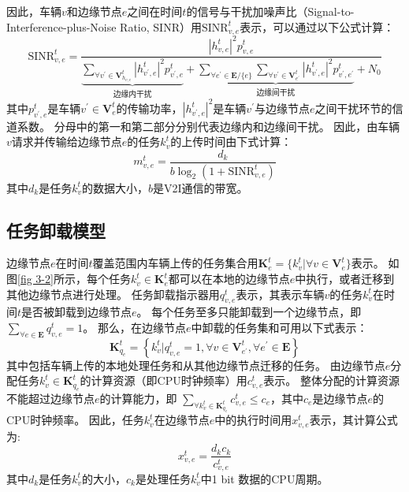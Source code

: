 因此，车辆$v$和边缘节点$e$之间在时间$t$的信号与干扰加噪声比（Signal-to-Interference-plus-Noise Ratio, SINR）用$\mathrm{SINR}_{v, e}^t$表示，可以通过以下公式计算：
\begin{equation}
	\mathrm{SINR}_{v, e}^t = \frac{ |h_{v, e}^t| ^{2}  p_{v, e}^{t}}{ \underbrace{\sum\limits_{\forall v^{\prime} \in \mathbf{V}_{h_{v, e}}^{t}} |h_{v^{\prime}, e}^t|^2 p_{v^{\prime}, e}^{t}}_{\text {边缘内干扰}} + \underbrace{\sum\limits_{\forall e^{\prime} \in \mathbf{E} / \{e\}} \sum\limits_{\forall v^{\prime} \in \mathbf{V}_{e^{\prime}}^{t}} |h_{v^{\prime}, e}^t|^2 p_{v^{\prime}, e^{\prime}}^{t}}_{\text {边缘间干扰}} + N_{0}}
\end{equation}
其中$p_{v^{\prime}, e}^{t}$是车辆$v^{\prime} \in \mathbf{V}_{e}^{t}$的传输功率，$|h_{v^{\prime}, e}^t|^2$是车辆$v^{\prime}$与边缘节点$e$之间干扰环节的信道系数。
分母中的第一和第二部分分别代表边缘内和边缘间干扰。
因此，由车辆$v$请求并传输给边缘节点$e$的任务$k_{v}^{t}$的上传时间由下式计算：
\begin{equation}
	m_{v, e}^{t} = \frac{d_{k}}{b  \log _{2}\left(1+\mathrm{SINR}_{v, e}^t\right)}
\end{equation}
其中$d_k$是任务$k_{v}^{t}$的数据大小，$b$是V2I通信的带宽。

\subsection[\hspace{-2pt}任务卸载模型]{{ \hspace{-8pt}任务卸载模型}}

边缘节点$e$在时间$t$覆盖范围内车辆上传的任务集合用$\mathbf{K}_{e}^{t} = \{ k_{v}^{t}| \forall v \in \mathbf{V}_{e}^{t} \}$表示。 
如图\ref{fig 3-2}所示，每个任务$k_{v}^{t} \in \mathbf{K}_{e}^{t}$都可以在本地的边缘节点$e$中执行，或者迁移到其他边缘节点进行处理。
任务卸载指示器用$q_{v, e}^{t}$表示，其表示车辆$v$的任务$k_{v}^{t}$在时间$t$是否被卸载到边缘节点$e$。
每个任务至多只能卸载到一个边缘节点，即$\sum_{\forall e \in \mathbf{E}} q_{v, e}^{t} = 1$。
那么，在边缘节点$e$中卸载的任务集和可用以下式表示：
\begin{equation}
	\mathbf{K}_{q_e}^{t} = \left\{ k_{v}^{t} | q_{v, e}^{t} = 1, \forall v \in \mathbf{V}_{e^{\prime}}^{t}, \forall e^{\prime} \in \mathbf{E} \right\}
\end{equation}
其中包括车辆上传的本地处理任务和从其他边缘节点迁移的任务。
由边缘节点$e$分配任务$k_{v}^{t} \in \mathbf{K}_{q_e}^{t}$的计算资源（即CPU时钟频率）用$c_{v, e}^{t}$表示。
整体分配的计算资源不能超过边缘节点$e$的计算能力，即 $ \sum_{\forall k_{v}^{t} \in {\mathbf{K}_{q_e}^{t} }} c_{v, e}^t \leq c_{e}$，其中$c_e$是边缘节点$e$的CPU时钟频率。
因此，任务$k_{v}^{t}$在边缘节点$e$中的执行时间用$x_{v, e}^t$表示，其计算公式为:
\begin{equation}
	x_{v, e}^t = \frac{ d_{k}  c_{k}}{c_{v, e}^t}
\end{equation}
其中$d_{k}$是任务$k_{v}^{t}$的大小，$c_{k}$是处理任务$k_{v}^{t}$中1 bit 数据的CPU周期。

